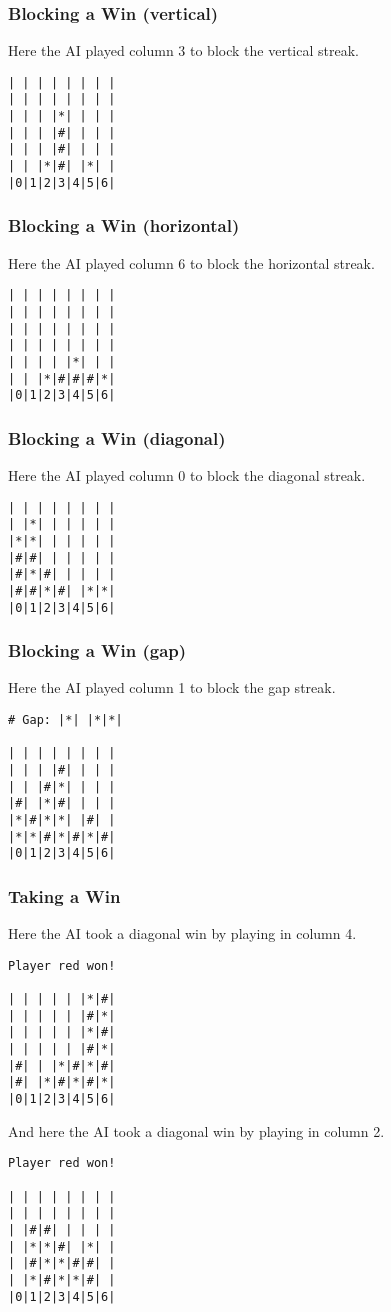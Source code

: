 \documentclass[12pt, article]{scrartcl}
\begin{document}
\subsubsection{Blocking a Win (vertical)}
Here the AI played column 3 to block the vertical streak.
\begin{verbatim}
| | | | | | | |
| | | | | | | |
| | | |*| | | |
| | | |#| | | |
| | | |#| | | |
| | |*|#| |*| |
|0|1|2|3|4|5|6|
\end{verbatim}

\subsubsection{Blocking a Win (horizontal)}
Here the AI played column 6 to block the horizontal streak.
\begin{verbatim}
| | | | | | | |
| | | | | | | |
| | | | | | | |
| | | | | | | |
| | | | |*| | |
| | |*|#|#|#|*|
|0|1|2|3|4|5|6|
\end{verbatim}

\subsubsection{Blocking a Win (diagonal)}
Here the AI played column 0 to block the diagonal streak.
\begin{verbatim}
| | | | | | | |
| |*| | | | | |
|*|*| | | | | |
|#|#| | | | | |
|#|*|#| | | | |
|#|#|*|#| |*|*|
|0|1|2|3|4|5|6|
\end{verbatim}

\subsubsection{Blocking a Win (gap)}
Here the AI played column 1 to block the gap streak.
\begin{verbatim}
# Gap: |*| |*|*|

| | | | | | | |
| | | |#| | | |
| | |#|*| | | |
|#| |*|#| | | |
|*|#|*|*| |#| |
|*|*|#|*|#|*|#|
|0|1|2|3|4|5|6|
\end{verbatim}

\subsubsection{Taking a Win}
Here the AI took a diagonal win by playing in column 4.
\begin{verbatim}
Player red won!

| | | | | |*|#|
| | | | | |#|*|
| | | | | |*|#|
| | | | | |#|*|
|#| | |*|#|*|#|
|#| |*|#|*|#|*|
|0|1|2|3|4|5|6|
\end{verbatim}
And here the AI took a diagonal win by playing in column 2.
\begin{verbatim}
Player red won!

| | | | | | | |
| | | | | | | |
| |#|#| | | | |
| |*|*|#| |*| |
| |#|*|*|#|#| |
| |*|#|*|*|#| |
|0|1|2|3|4|5|6|
\end{verbatim}
\end{document}
